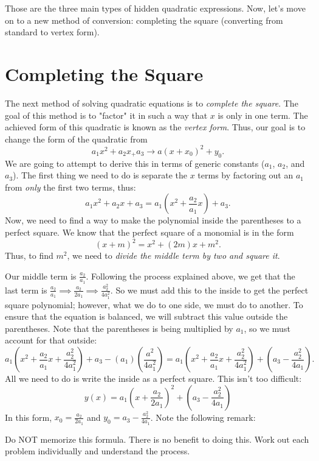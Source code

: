 \documentclass[lang=en,11pt]{elegantbook}
\begin{document}
Those are the three main types of hidden quadratic expressions.  Now, let's move on to a new method of conversion: completing the square (converting from standard to vertex form).
\section{Completing the Square}
\noindent The next method of solving quadratic equations is to \textit{complete the square}.  The goal of this method is to "factor" it in such a way that $x$ is only in one term.  The achieved form of this quadratic is known as the \textit{vertex form}.  Thus, our goal is to change the form of the quadratic from $$a_1x^2+a_2x_+a_3\longrightarrow a(x+x_0)^2+y_0.$$
We are going to attempt to derive this in terms of generic constants ($a_1$, $a_2$, and $a_3$).  The first thing we need to do is separate the $x$ terms by factoring out an $a_1$ from \textit{only} the first two terms, thus: $$a_1x^2+a_2x+a_3=a_1\left(x^2+\frac{a_2}{a_1}x\right)+a_3.$$  Now, we need to find a way to make the polynomial inside the parentheses to a perfect square.  We know that the perfect square of a monomial is in the form $$(x+m)^2=x^2+(2m)x+m^2.$$  Thus, to find $m^2$, we need to \textit{divide the middle term by two and square it}.

Our middle term is $\displaystyle \frac{a_2}{a_1}$.  Following the process explained above, we get that the last term is $\displaystyle \frac{a_2}{a_1} \implies \frac{a_2}{2a_1} \implies \frac{a_2^2}{4a_1^2}$.  So we must add this to the inside to get the perfect square polynomial; however, what we do to one side, we must do to another.  To ensure that the equation is balanced, we will subtract this value outside the parentheses.  Note that the parentheses is being multiplied by $a_1$, so we must account for that outside:
$$a_1\left(x^2+\frac{a_2}{a_1}x+\frac{a_2^2}{4a_1^2}\right)+a_3-\left(a_1\right)\left(\frac{a^2}{4a_1^2}\right)=a_1\left(x^2+\frac{a_2}{a_1}x+\frac{a_2^2}{4a_1^2}\right)+\left(a_3-\frac{a_2^2}{4a_1}\right).$$
All we need to do is write the inside as a perfect square.  This isn't too difficult:
$$y(x)=a_1\left(x+\frac{a_2}{2a_1}\right)^2+\left(a_3-\frac{a_2^2}{4a_1}\right)$$
In this form, $\displaystyle x_0=\frac{a_2}{2a_1}$ and $\displaystyle y_0=a_3-\frac{a_2^2}{4a_1}$.  Note the following remark:

\begin{remark}
  Do NOT memorize this formula.  There is no benefit to doing this.  Work out each problem individually and understand the process.
\end{remark}
\end{document}
